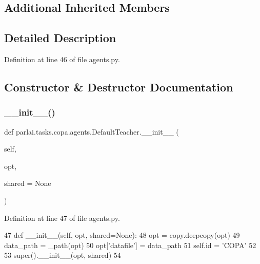 \subsection*{Additional Inherited Members}


\subsection{Detailed Description}


Definition at line 46 of file agents.\+py.



\subsection{Constructor \& Destructor Documentation}
\mbox{\label{classparlai_1_1tasks_1_1copa_1_1agents_1_1DefaultTeacher_af17bb5546ce20e08939af89fd069beeb}} 
\subsubsection{\texorpdfstring{\+\_\+\+\_\+init\+\_\+\+\_\+()}{\_\_init\_\_()}}
{\footnotesize\ttfamily def parlai.\+tasks.\+copa.\+agents.\+Default\+Teacher.\+\_\+\+\_\+init\+\_\+\+\_\+ (\begin{DoxyParamCaption}\item[{}]{self,  }\item[{}]{opt,  }\item[{}]{shared = {\ttfamily None} }\end{DoxyParamCaption})}



Definition at line 47 of file agents.\+py.


\begin{DoxyCode}
47     \textcolor{keyword}{def }\_\_init\_\_(self, opt, shared=None):
48         opt = copy.deepcopy(opt)
49         data\_path = \_path(opt)
50         opt[\textcolor{stringliteral}{'datafile'}] = data\_path
51         self.id = \textcolor{stringliteral}{'COPA'}
52 
53         super().\_\_init\_\_(opt, shared)
54 
\end{DoxyCode}


